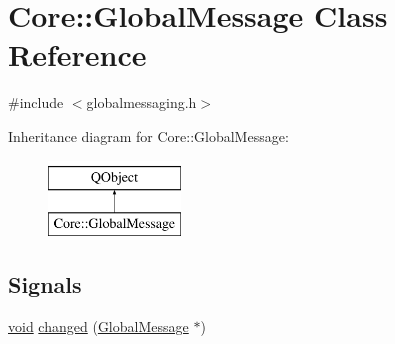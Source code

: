 \hypertarget{class_core_1_1_global_message}{\section{Core\-:\-:Global\-Message Class Reference}
\label{class_core_1_1_global_message}
}


{\ttfamily \#include $<$globalmessaging.\-h$>$}

Inheritance diagram for Core\-:\-:Global\-Message\-:\begin{figure}[H]
\begin{center}
\leavevmode
\includegraphics[height=2.000000cm]{class_core_1_1_global_message}
\end{center}
\end{figure}
\subsection*{Signals}
\begin{DoxyCompactItemize}
\item 
\hyperlink{group___u_a_v_objects_plugin_ga444cf2ff3f0ecbe028adce838d373f5c}{void} \hyperlink{group___core_plugin_ga7fa44bc2a2dc20b8a175e2bb0ca0f042}{changed} (\hyperlink{class_core_1_1_global_message}{Global\-Message} $\ast$)
\end{DoxyCompactItemize}
